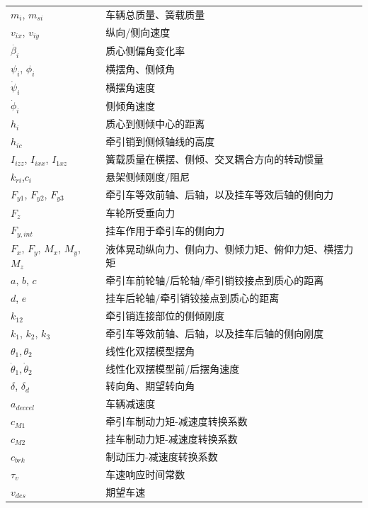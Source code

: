 {\begin{longtable}{l l}
        $m_i$, $m_{si}$ & 车辆总质量、簧载质量 \\
        $v_{ix}$, $v_{iy}$ & 纵向/侧向速度 \\
        $\dot{\beta_i}$ & 质心侧偏角变化率 \\
        $\psi_i$, $\phi_i$ & 横摆角、侧倾角 \\
        $\dot{\psi}_i$ & 横摆角速度 \\
        $\dot{\phi}_i$ & 侧倾角速度 \\
        $h_i$ & 质心到侧倾中心的距离 \\
        $h_{ic}$ & 牵引销到侧倾轴线的高度 \\
        $I_{izz}$, $I_{ixx}$, $I_{1xz}$ & 簧载质量在横摆、侧倾、交叉耦合方向的转动惯量 \\
        $k_{ri}$,$c_i$ & 悬架侧倾刚度/阻尼 \\
        $F_{y1}$, $F_{y2}$, $F_{y3}$ & 牵引车等效前轴、后轴，以及挂车等效后轴的侧向力 \\
        $F_z$ & 车轮所受垂向力 \\
        $F_{y,int}$ & 挂车作用于牵引车的侧向力 \\
        $F_x$, $F_y$, $M_x$, $M_y$, $M_z$ & 液体晃动纵向力、侧向力、侧倾力矩、俯仰力矩、横摆力矩 \\
        $a$, $b$, $c$ & 牵引车前轮轴/后轮轴/牵引销铰接点到质心的距离 \\
        $d$, $e$ & 挂车后轮轴/牵引销铰接点到质心的距离 \\
        $k_{12}$ & 牵引销连接部位的侧倾刚度 \\
        $k_1$, $k_2$, $k_3$ & 牵引车等效前轴、后轴，以及挂车后轴的侧向刚度 \\
        $\theta_1,\theta_2$ & 线性化双摆模型摆角 \\
        $\dot{\theta}_1,\dot{\theta}_2$ & 线性化双摆模型前/后摆角速度 \\
        $\delta$, $\delta_d$ & 转向角、期望转向角 \\
        $a_{deccel}$ & 车辆减速度 \\
        $c_{M1}$ & 牵引车制动力矩-减速度转换系数 \\
        $c_{M2}$ & 挂车制动力矩-减速度转换系数 \\
        $c_{brk}$ & 制动压力-减速度转换系数 \\
        $\tau_v$ & 车速响应时间常数 \\
        $v_{des}$ & 期望车速 \\

\end{longtable}}
